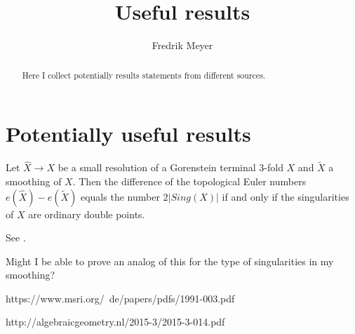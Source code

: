 \documentclass[11pt, english]{article}
\begin{document}
\title{Useful results}
\author{Fredrik Meyer}
\maketitle 

\begin{abstract}
 Here I collect potentially results statements from different sources.
\end{abstract}

\section{Potentially useful results}

\begin{prop}
Let $\widehat X \to X$ be a small resolution of a Gorenstein terminal 3-fold $X$ and $\widetilde X$ a smoothing of $X$. Then the difference of the topological Euler numbers $e(\widehat X) - e(\widetilde X)$ equals the number $2\lvert Sing(X) \rvert$ if and only if the singularities of $X$ are ordinary double points.
\end{prop}
See \cite{wang_connectedness}.

Might I be able to prove an analog of this for the type of singularities in my smoothing?


https://www.msri.org/~de/papers/pdfs/1991-003.pdf

http://algebraicgeometry.nl/2015-3/2015-3-014.pdf



\end{document}

